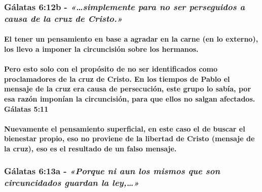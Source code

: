 \documentclass[11a pt,twoside]{article}
\newcommand{\scripture}[1]{%
  {\fontsize{12pt}{16pt}\selectfont\ScriptureFont\itshape #1}%
}
\let\oldsubsubsection\subsubsection
\renewcommand{\subsubsection}{\needspace{4\baselineskip}\oldsubsubsection}
\let\oldparagraph\paragraph
\renewcommand{\paragraph}{\needspace{3\baselineskip}\oldparagraph}
\begin{document}
\subsubsection{\texorpdfstring{Gálatas 6:12b -
\scripture{«…simplemente para no ser perseguidos a causa de la cruz de Cristo.»}}{Gálatas 6:12b - }}\label{guxe1latas-612b---simplemente-para-no-ser-perseguidos-a-causa-de-la-cruz-de-cristo.}

\paragraph{El tener un pensamiento en base a agradar en la carne (en lo
externo), los llevo a imponer la circuncisión sobre los
hermanos.}\label{el-tener-un-pensamiento-en-base-a-agradar-en-la-carne-en-lo-externo-los-llevo-a-imponer-la-circuncisiuxf3n-sobre-los-hermanos.}

\paragraph{Pero esto solo con el propósito de no ser identificados como
proclamadores de la cruz de Cristo. En los tiempos de Pablo el mensaje
de la cruz era causa de persecución, este grupo lo sabía, por esa razón
imponían la circuncisión, para que ellos no salgan afectados. Gálatas
5:11}\label{pero-esto-solo-con-el-propuxf3sito-de-no-ser-identificados-como-proclamadores-de-la-cruz-de-cristo.-en-los-tiempos-de-pablo-el-mensaje-de-la-cruz-era-causa-de-persecuciuxf3n-este-grupo-lo-sabuxeda-por-esa-razuxf3n-imponuxedan-la-circuncisiuxf3n-para-que-ellos-no-salgan-afectados.-guxe1latas-511}

\paragraph{Nuevamente el pensamiento superficial, en este caso el de
buscar el bienestar propio, eso no proviene de la libertad de Cristo
(mensaje de la cruz), eso es el resultado de un falso
mensaje.}\label{nuevamente-el-pensamiento-superficial-en-este-caso-el-de-buscar-el-bienestar-propio-eso-no-proviene-de-la-libertad-de-cristo-mensaje-de-la-cruz-eso-es-el-resultado-de-un-falso-mensaje.}

\subsubsection{\texorpdfstring{Gálatas 6:13a -
\scripture{«Porque ni aun los mismos que son circuncidados guardan la ley,…»}}{Gálatas 6:13a - }}\label{guxe1latas-613a---porque-ni-aun-los-mismos-que-son-circuncidados-guardan-la-ley}
\end{document}
